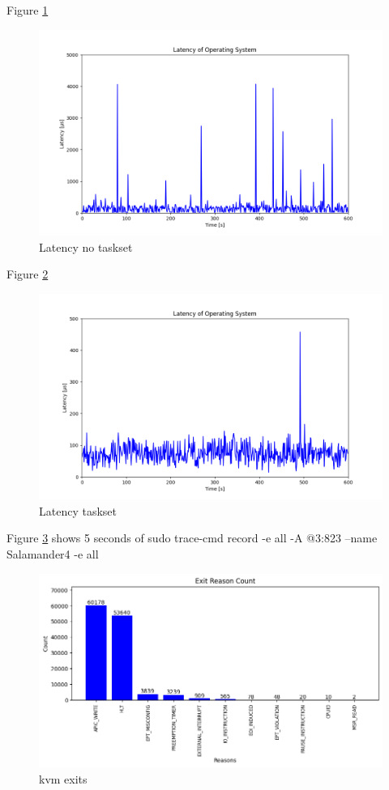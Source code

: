 \documentclass[MMR,Master,english]{twbook}
\begin{document}
 
 
 Figure \ref{fig:latency_no_taskset}
 
 \begin{figure}[H]
     \centering
     \includegraphics[width=0.8\columnwidth]{img/latency_default.png}
     \caption[Latency no taskset]{Latency no taskset}
     \label{fig:latency_no_taskset}
   \end{figure}
 
 
   Figure \ref{fig:latency_taskset}
   \begin{figure}[H]
     \centering
     \includegraphics[width=0.8\columnwidth]{img/latency_taskset.png}
     \caption[Latency taskset]{Latency taskset}
     \label{fig:latency_taskset}
   \end{figure}
 
 Figure \ref{fig:kvm_exits} shows 5 seconds of sudo trace-cmd record -e all -A @3:823 --name Salamander4 -e all




 \begin{figure}[H]
     \centering
     \includegraphics[width=0.8\columnwidth]{img/kvm_exits.png}
     \caption[kvm exits]{kvm exits}
     \label{fig:kvm_exits}
   \end{figure}
 
\end{document}
